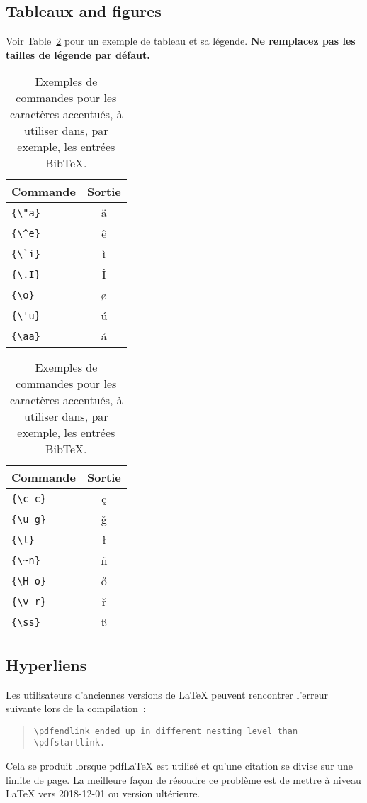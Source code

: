 \documentclass[11pt,french,hyphens]{article}
\begin{document}
\subsection{Tableaux and figures}

Voir Table~\ref{tab:accents} pour un exemple de tableau et sa légende.
\textbf{Ne remplacez pas les tailles de légende par défaut.}

\begin{table}
\centering
\begin{tabular}{lc}
\hline
\textbf{Commande} & \textbf{Sortie}\\
\hline
\verb|{\"a}| & {\"a} \\
\verb|{\^e}| & {\^e} \\
\verb|{\`i}| & {\`i} \\ 
\verb|{\.I}| & {\.I} \\ 
\verb|{\o}| & {\o} \\
\verb|{\'u}| & {\'u}  \\ 
\verb|{\aa}| & {\aa}  \\\hline
\end{tabular}
\begin{tabular}{lc}
\hline
\textbf{Commande} & \textbf{Sortie}\\
\hline
\verb|{\c c}| & {\c c} \\ 
\verb|{\u g}| & {\u g} \\ 
\verb|{\l}| & {\l} \\ 
\verb|{\~n}| & {\~n} \\ 
\verb|{\H o}| & {\H o} \\ 
\verb|{\v r}| & {\v r} \\ 
\verb|{\ss}| & {\ss} \\
\hline
\end{tabular}
\caption{Exemples de commandes pour les caractères accentués, à utiliser dans, par exemple, les entrées Bib\TeX{}.}
\label{tab:accents}
\end{table}

\subsection{Hyperliens}

Les utilisateurs d'anciennes versions de \LaTeX{} peuvent rencontrer l'erreur suivante lors de la compilation :
\begin{quote}
\tt\verb|\pdfendlink| ended up in different nesting level than \verb|\pdfstartlink|.
\end{quote}
Cela se produit lorsque pdf\LaTeX{} est utilisé et qu'une citation se divise sur une limite de page. La meilleure façon de résoudre ce problème est de mettre à niveau \LaTeX{} vers 2018-12-01 ou version ultérieure.
\end{document}
